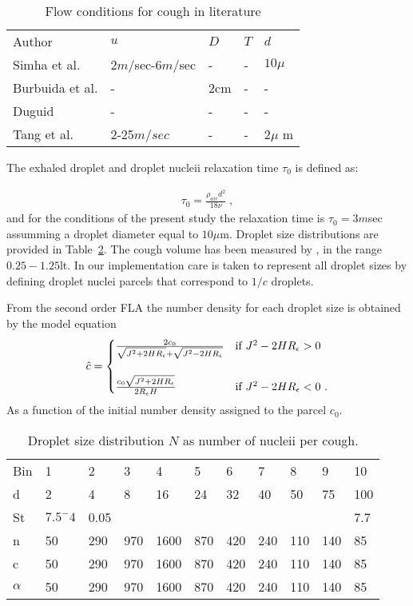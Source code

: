 \documentclass[%
 aip,
 amsmath,amssymb,
 reprint,%
]{revtex4-1}
\begin{document}
\begin{table}
\caption{\label{TB0010} Flow conditions for cough in literature}
\begin{tabular}{l|llll}
        Author & $u$ & $D$ & $T$ & $d$ \\
        Simha et al. \cite{Verma2020} & 2$m/$sec-6$m/$sec & - & - & $10\mu$ \\
        Burbuida et al. \cite{Bourouiba2014} & - & $2$cm &  - & -  \\
        Duguid \cite{Duguid1946} & - & -  & - & - \\
        Tang et al. \cite{Tang2009} & 2-25$m/sec$ & - & - & $2\mu$ m
\end{tabular}
\end{table}
 
The exhaled droplet and droplet nucleii relaxation time $\tau_0$ is defined as:

\begin{eqnarray}
	\tau_0=\frac{\rho_{air} d^2}{18 \nu} \;,
\end{eqnarray}
and for the conditions of the present study the relaxation time is $\tau_0=3m$sec assumming a droplet diameter equal to $10\mu$m. Droplet size distributions are provided \cite{Duguid1946} in Table~\ref{TB0020}. The cough volume has been measured by \citet{Bourouiba2014}, in the range $0.25-1.25$lt. In our implementation care is taken to represent all droplet sizes by defining droplet nuclei parcels that correspond to $1/c$ droplets. 

From the second order FLA the number density for each droplet size is obtained by the model equation 
\begin{equation}
\label{EQ-INT-080}
\hat{c}=
        \begin{cases}
		\frac{2 c_0}{\sqrt{J^2+2 H R_\epsilon} + \sqrt{J^2 - 2 H R_\epsilon} }  & \text{if $ J^2-2 H R_\epsilon  > 0 $ } \\
         \\
            \frac{c_0 \sqrt{J^2+2 H R_\epsilon} }{2 R_\epsilon H }  & \text{if $ J^2-2 H R_\epsilon < 0  $ } .
        \end{cases}
\end{equation}
As a function of the initial number density assigned to the parcel $c_0$.

\begin{table}
\caption{\label{TB0020} Droplet size distribution $N$ as number of nucleii per cough.}
\begin{tabular}{l|llllllllll}
Bin & 1 & 2 & 3 & 4 & 5 & 6 &7 &8 &9 &10 \\
d & 2  & 4   & 8   & 16   & 24  & 32  & 40  & 50  & 75  & 100 \\
St & $7.5^-4$ & 0.05 &     &      &     &     &     &     &     & 7.7 \\
n & 50 & 290 & 970 & 1600 & 870 & 420 & 240 & 110 & 140 & 85  \\
c & 50 & 290 & 970 & 1600 & 870 & 420 & 240 & 110 & 140 & 85  \\
$\alpha$ & 50 & 290 & 970 & 1600 & 870 & 420 & 240 & 110 & 140 & 85  \\
\end{tabular}
\end{table}
\end{document}
